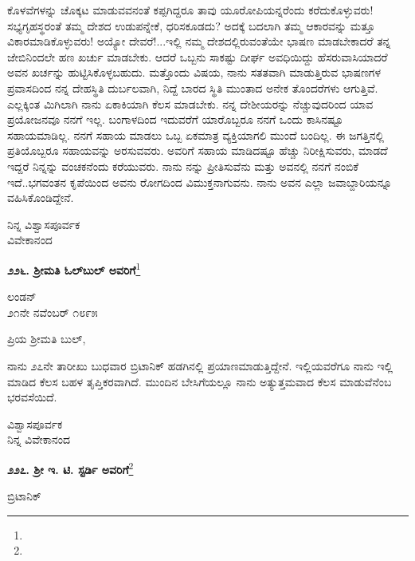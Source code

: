 ಕೊಳವೆಗಳನ್ನು ಚೊಕ್ಕಟ ಮಾಡುವವನಂತೆ ಕಪ್ಪಗಿದ್ದರೂ ತಾವು ಯೂರೋಪಿಯನ್ನರೆಂದು ಕರೆದುಕೊಳ್ಳುವರು! ಸಭ್ಯಗೃಹಸ್ಥರಂತೆ ತಮ್ಮ ದೇಶದ ಉಡುಪನ್ನೇಕೆ, ಧರಿಸಕೂಡದು? ಅದಕ್ಕೆ ಬದಲಾಗಿ ತಮ್ಮ ಆಕಾರವನ್ನು ಮತ್ತೂ ವಿಕಾರಮಾಡಿಕೊಳ್ಳುವರು! ಅಯ್ಯೋ ದೇವರೆ!...ಇಲ್ಲಿ ನಮ್ಮ ದೇಶದಲ್ಲಿರುವಂತೆಯೇ ಭಾಷಣ ಮಾಡಬೇಕಾದರೆ ತನ್ನ ಜೇಬಿನಿಂದಲೇ ಹಣ ಖರ್ಚು ಮಾಡಬೇಕು. ಆದರೆ ಒಬ್ಬನು ಸಾಕಷ್ಟು ದೀರ್ಘ ಅವಧಿಯಿದ್ದು ಹೆಸರುವಾಸಿಯಾದರೆ ಅವನ ಖರ್ಚನ್ನು ಹುಟ್ಟಿಸಿಕೊಳ್ಳಬಹುದು. ಮತ್ತೊಂದು ವಿಷಯ, ನಾನು ಸತತವಾಗಿ ಮಾಡುತ್ತಿರುವ ಭಾಷಣಗಳ ಪ್ರವಾಸದಿಂದ ನನ್ನ ದೇಹಸ್ಥಿತಿ ದುರ್ಬಲವಾಗಿ, ನಿದ್ದೆ ಬಾರದ ಸ್ಥಿತಿ ಮುಂತಾದ ಅನೇಕ ತೊಂದರೆಗಳು ಆಗುತ್ತಿವೆ. ಎಲ್ಲಕ್ಕಿಂತ ಮಿಗಿಲಾಗಿ ನಾನು ಏಕಾಕಿಯಾಗಿ ಕೆಲಸ ಮಾಡಬೇಕು. ನನ್ನ ದೇಶೀಯರನ್ನು ನೆಚ್ಚುವುದರಿಂದ ಯಾವ ಪ್ರಯೋಜನವೂ ನನಗೆ ಇಲ್ಲ. ಬಂಗಾಳದಿಂದ ಇದುವರೆಗೆ ಯಾರೊಬ್ಬರೂ ನನಗೆ ಒಂದು ಕಾಸಿನಷ್ಟೂ ಸಹಾಯಮಾಡಿಲ್ಲ. ನನಗೆ ಸಹಾಯ ಮಾಡಲು ಒಬ್ಬ ಏಕಮಾತ್ರ ವ್ಯಕ್ತಿಯಾಗಲಿ ಮುಂದೆ ಬಂದಿಲ್ಲ. ಈ ಜಗತ್ತಿನಲ್ಲಿ ಪ್ರತಿಯೊಬ್ಬರೂ ಸಹಾಯವನ್ನು ಅರಸುವವರು. ಅವರಿಗೆ ಸಹಾಯ ಮಾಡಿದಷ್ಟೂ ಹೆಚ್ಚು ನಿರೀಕ್ಷಿಸುವರು, ಮಾಡದೆ ಇದ್ದರೆ ನಿನ್ನನ್ನು ವಂಚಕನೆಂದು ಕರೆಯುವರು. ನಾನು\enginline{-} ನನ್ನು ಪ್ರೀತಿಸುವೆನು ಮತ್ತು ಅವನಲ್ಲಿ ನನಗೆ ನಂಬಿಕೆ ಇದೆ..ಭಗವಂತನ ಕೃಪೆಯಿಂದ ಅವನು ರೋಗದಿಂದ ವಿಮುಕ್ತನಾಗುವನು. ನಾನು ಅವನ ಎಲ್ಲಾ ಜವಾಬ್ದಾರಿಯನ್ನೂ ವಹಿಸಿಕೊಂಡಿದ್ದೇನೆ.

{\flushright
ನಿನ್ನ ವಿಶ್ವಾಸಪೂರ್ವಕ\\ವಿವೇಕಾನಂದ\par}
\vspace{-0.2cm}

\begin{center}
\textbf{೨೨೬. ಶ‍್ರೀಮತಿ ಓಲ್‌ಬುಲ್‌ ಅವರಿಗೆ}\footnote{}
\end{center}
\vspace{-0.2cm}

\begin{flushright}
ಲಂಡನ್\\೨೧ನೇ ನವೆಂಬರ್ ೧೮೯೫
\end{flushright}

\noindent
ಪ್ರಿಯ ಶ‍್ರೀಮತಿ ಬುಲ್,

ನಾನು ೨೭ನೇ ತಾರೀಖು ಬುಧವಾರ ಬ್ರಿಟಾನಿಕ್ ಹಡಗಿನಲ್ಲಿ ಪ್ರಯಾಣ\break ಮಾಡುತ್ತಿದ್ದೇನೆ. ಇಲ್ಲಿಯವರೆಗೂ ನಾನು ಇಲ್ಲಿ ಮಾಡಿದ ಕೆಲಸ ಬಹಳ ತೃಪ್ತಿಕರ\break ವಾಗಿದೆ. ಮುಂದಿನ ಬೇಸಿಗೆಯಲ್ಲೂ ನಾನು ಅತ್ಯುತ್ತಮವಾದ ಕೆಲಸ ಮಾಡುವೆನೆಂಬ ಭರವಸೆಯಿದೆ.

{\flushright
ವಿಶ್ವಾಸಪೂರ್ವಕ\\ನಿನ್ನ ವಿವೇಕಾನಂದ\par}

\begin{center}
\textbf{೨೨೭. ಶ‍್ರೀ ಇ. ಟಿ. ಸ್ಟರ್ಡಿ ಅವರಿಗೆ}\footnote{}
\end{center}

\begin{flushright}
 ಬ್ರಿಟಾನಿಕ್
\end{flushright}

